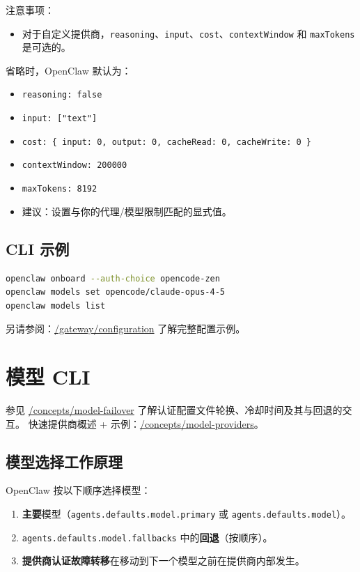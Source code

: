 注意事项：

\begin{itemize}
  \item 对于自定义提供商，\texttt{reasoning}、\texttt{input}、\texttt{cost}、\texttt{contextWindow} 和 \texttt{maxTokens} 是可选的。
\end{itemize}

省略时，OpenClaw 默认为：
\begin{itemize}
  \item \texttt{reasoning: false}
  \item \texttt{input: ["text"]}
  \item \texttt{cost: \{ input: 0, output: 0, cacheRead: 0, cacheWrite: 0 \}}
  \item \texttt{contextWindow: 200000}
  \item \texttt{maxTokens: 8192}
  \item 建议：设置与你的代理/模型限制匹配的显式值。
\end{itemize}


\subsection{CLI 示例}


\begin{lstlisting}[language=bash]
openclaw onboard --auth-choice opencode-zen
openclaw models set opencode/claude-opus-4-5
openclaw models list
\end{lstlisting}


另请参阅：\href{/gateway/configuration}{/gateway/configuration} 了解完整配置示例。


\clearpage

\section{模型 CLI}


参见 \href{/concepts/model-failover}{/concepts/model-failover} 了解认证配置文件轮换、冷却时间及其与回退的交互。
快速提供商概述 + 示例：\href{/concepts/model-providers}{/concepts/model-providers}。

\subsection{模型选择工作原理}


OpenClaw 按以下顺序选择模型：

\begin{enumerate}
  \item \textbf{主要}模型（\texttt{agents.defaults.model.primary} 或 \texttt{agents.defaults.model}）。
  \item \texttt{agents.defaults.model.fallbacks} 中的\textbf{回退}（按顺序）。
  \item \textbf{提供商认证故障转移}在移动到下一个模型之前在提供商内部发生。
\end{enumerate}


